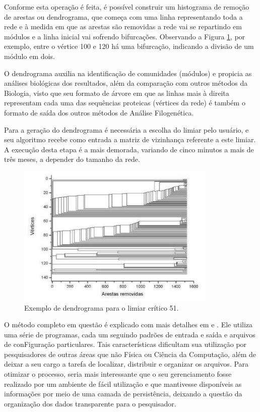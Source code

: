Conforme esta operação é feita, é possível construir um histograma de remoção de arestas ou dendrograma, que começa com uma linha representando toda a rede
e à medida em que as arestas são removidas a rede vai se repartindo em módulos e a linha inicial vai sofrendo bifurcações. Observando a Figura
\ref{fig:dendrograma}, por exemplo, entre o vértice 100 e 120 há uma bifurcação, indicando a divisão de um módulo em dois.

O dendrograma auxilia na identificação de comunidades (módulos) e propicia as análises biológicas dos resultados, além da comparação com outros
métodos da Biologia, visto que seu formato de árvore em que as linhas mais à direita representam cada uma das sequências proteicas (vértices da rede)
é também o formato de saída dos outros métodos de Análise Filogenética. 

Para a geração do dendrograma é necessária a escolha do limiar pelo usuário, e seu algoritmo recebe como entrada a matriz de vizinhança referente a este
limiar. A execução desta etapa é a mais demorada, variando de cinco minutos a mais de três meses, a depender do
tamanho da rede. 

\begin{figure}
\centering
\includegraphics[scale=0.73]{dendrograma}
\caption{Exemplo de dendrograma para o limiar crítico 51.}
\label{fig:dendrograma}
\end{figure}

O método completo em questão é explicado com mais detalhes em \cite{goesneto2010} e \cite{andrade2011}. Ele utiliza uma série de programas, cada um
seguindo padrões de entrada e saída e arquivos de conFiguração particulares. Tais características dificultam sua utilização por pesquisadores de outras
áreas que não Física ou Ciência da Computação, além de deixar a seu cargo a tarefa de localizar, distribuir e organizar os arquivos. Para otimizar
o processo, seria mais interessante que o seu gerenciamento fosse realizado por um ambiente de fácil utilização e que
mantivesse disponíveis as informações por meio de uma camada de persistência, deixando a questão da organização dos dados transparente para o
pesquisador.

